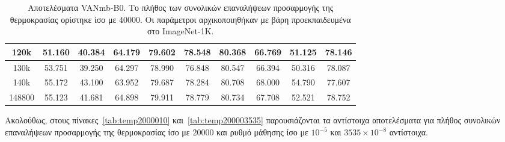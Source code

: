\documentclass[12pt]{article}
\numberwithin{equation}{section}
\begin{document}
\begin{table}[htbp]
{\begin{tabular}{|c|c|c|c|c|c|c|c|c|c|}
120k   & 51.160 & 40.384 & 64.179 & 79.602 & 78.548 & 80.368 & 66.769 & 51.125 & 78.146 \\ \hline
130k   & 53.751 & 39.250 & 64.297 & 78.990 & 76.848 & 80.547 & 66.394 & 50.316 & 78.087 \\ \hline
140k   & 55.172 & 43.100 & 63.952 & 79.687 & 78.284 & 80.708 & 68.000 & 54.790 & 77.607 \\ \hline
148800 & 55.123 & 41.681 & 64.898 & 79.911 & 78.779 & 80.734 & 67.708 & 52.521 & 78.752 \\ \hline
\end{tabular}}
\caption{Αποτελέσματα VANmb-B0. Το πλήθος των συνολικών επαναλήψεων προσαρμογής της θερμοκρασίας ορίστηκε ίσο με 40000. Οι παράμετροι αρχικοποιηθήκαν με βάρη προεκπαιδευμένα στο ImageNet-1K.}
\label{tab:temp40000}
\end{table}

Ακολούθως, στους πίνακες~\ref{tab:temp2000010} και~\ref{tab:temp200003535} παρουσιάζονται τα αντίστοιχα αποτελέσματα για πλήθος συνολικών επαναλήψεων προσαρμογής της θερμοκρασίας ίσο με 20000 και ρυθμό μάθησης ίσο με \(10^{-5}\) και \(3535 \times 10^{-8}\) αντίστοιχα.  
\end{document}
